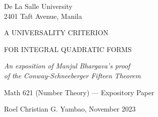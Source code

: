 \thispagestyle{empty}
{\centering



    {
        De La Salle University\\
        2401 Taft Avenue, Manila
    }

    \vspace*{2in}

    {
        \Large
        A UNIVERSALITY CRITERION

        \vspace*{0.15in}
        
        FOR INTEGRAL QUADRATIC FORMS
    }

    \vspace*{0.2in}

    {\itshape
        \normalsize
        An exposition of Manjul Bhargava's proof\\
        of the Conway-Schneeberger Fifteen Theorem
    }

    \vspace*{0.2in}

    \vspace*{\fill}

    {
        \large
       Math 621 (Number Theory) --- Expository Paper
    }

    \vspace*{0.15in}


    {
        Roel Christian G. Yambao, November 2023
    }

    
}